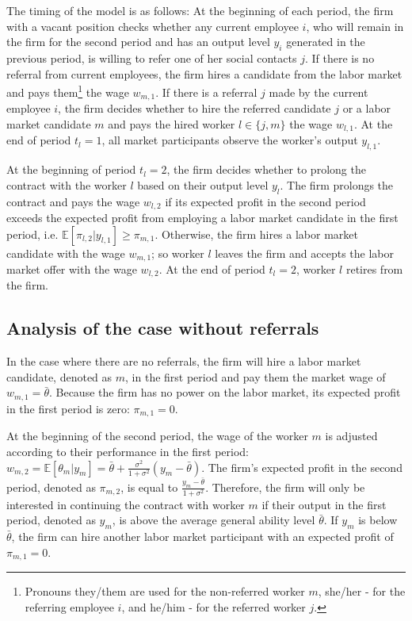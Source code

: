 \documentclass[12pt]{article}
\begin{document}
The timing of the model is as follows: At the beginning of each period, the firm with a vacant position checks whether any current employee $i$, who will remain in the firm for the second period and has an output level $y_i$ generated in the previous period, is willing to refer one of her social contacts $j$. If there is no referral from current employees, the firm hires a candidate from the labor market and pays them\footnote{Pronouns they/them are used for the non-referred worker $m$, she/her - for the referring employee $i$, and he/him - for the referred worker $j$.} the wage $w_{m,1}$. If there is a referral $j$ made by the current employee $i$, the firm decides whether to hire the referred candidate $j$ or a labor market candidate $m$ and pays the hired worker $l \in \lbrace j,m \rbrace$ the wage $w_{l,1}$. At the end of period $t_l = 1$, all market participants observe  the worker's output $y_{l,1}$. %

At the beginning of period $t_l =2$, the firm decides whether to prolong the contract with the worker $l$ based on their output level $y_l$. The firm prolongs the contract and pays the wage $w_{l,2}$ if its expected profit in the second period exceeds the expected profit from employing a labor market candidate in the first period, i.e. $\mathbb{E}[\pi_{l,2}|y_{l,1}] \geq \pi_{m,1}$. Otherwise, the firm hires a labor market candidate with the wage $w_{m,1}$; so worker $l$ leaves the firm and accepts the labor market offer with the wage $w_{l,2}$. At the end of period $t_l = 2$, worker $l$ retires from the firm.

\subsection{Analysis of the case without referrals}

In the case where there are no referrals, the firm will hire a labor market candidate, denoted as $m$, in the first period and pay them the market wage of $w_{m,1} = \bar{\theta}$. Because the firm has no power on the labor market, its expected profit in the first period is zero: $\pi_{m,1} = 0$.

At the beginning of the second period, the wage of the worker $m$ is adjusted according to their performance in the first period: $w_{m,2} = \mathbb{E}[\theta_m|y_m] = \bar{\theta} + \frac{\sigma^2}{1+\sigma^2}(y_m-\bar{\theta})$. The firm's expected profit in the second period, denoted as $\pi_{m,2}$, is equal to $\frac{y_m-\bar{\theta}}{1+\sigma^2}$. Therefore, the firm will only be interested in continuing the contract with worker $m$ if their output in the first period, denoted as $y_m$, is above the average general ability level $\bar{\theta}$. If $y_m$ is below $\bar{\theta}$, the firm can hire another labor market participant with an expected profit of $\pi_{m,1}=0$.
\end{document}
